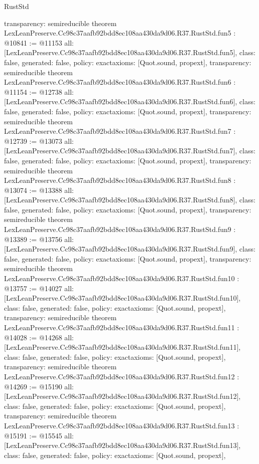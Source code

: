\begin{lexlean}{RustStd}
\begin{coremodule}
{  transparency: semireducible
}
theorem LexLeanPreserve.Cc98c37aafb92bdd8ec108aa430da9d06.R37.RustStd.fun5 : @10841 := @11153 {
  all: [LexLeanPreserve.Cc98c37aafb92bdd8ec108aa430da9d06.R37.RustStd.fun5],
  class: false,
  generated: false,
  policy: exact{axioms: [Quot.sound, propext]},
  transparency: semireducible
}
theorem LexLeanPreserve.Cc98c37aafb92bdd8ec108aa430da9d06.R37.RustStd.fun6 : @11154 := @12738 {
  all: [LexLeanPreserve.Cc98c37aafb92bdd8ec108aa430da9d06.R37.RustStd.fun6],
  class: false,
  generated: false,
  policy: exact{axioms: [Quot.sound, propext]},
  transparency: semireducible
}
theorem LexLeanPreserve.Cc98c37aafb92bdd8ec108aa430da9d06.R37.RustStd.fun7 : @12739 := @13073 {
  all: [LexLeanPreserve.Cc98c37aafb92bdd8ec108aa430da9d06.R37.RustStd.fun7],
  class: false,
  generated: false,
  policy: exact{axioms: [Quot.sound, propext]},
  transparency: semireducible
}
theorem LexLeanPreserve.Cc98c37aafb92bdd8ec108aa430da9d06.R37.RustStd.fun8 : @13074 := @13388 {
  all: [LexLeanPreserve.Cc98c37aafb92bdd8ec108aa430da9d06.R37.RustStd.fun8],
  class: false,
  generated: false,
  policy: exact{axioms: [Quot.sound, propext]},
  transparency: semireducible
}
theorem LexLeanPreserve.Cc98c37aafb92bdd8ec108aa430da9d06.R37.RustStd.fun9 : @13389 := @13756 {
  all: [LexLeanPreserve.Cc98c37aafb92bdd8ec108aa430da9d06.R37.RustStd.fun9],
  class: false,
  generated: false,
  policy: exact{axioms: [Quot.sound, propext]},
  transparency: semireducible
}
theorem LexLeanPreserve.Cc98c37aafb92bdd8ec108aa430da9d06.R37.RustStd.fun10 : @13757 := @14027 {
  all: [LexLeanPreserve.Cc98c37aafb92bdd8ec108aa430da9d06.R37.RustStd.fun10],
  class: false,
  generated: false,
  policy: exact{axioms: [Quot.sound, propext]},
  transparency: semireducible
}
theorem LexLeanPreserve.Cc98c37aafb92bdd8ec108aa430da9d06.R37.RustStd.fun11 : @14028 := @14268 {
  all: [LexLeanPreserve.Cc98c37aafb92bdd8ec108aa430da9d06.R37.RustStd.fun11],
  class: false,
  generated: false,
  policy: exact{axioms: [Quot.sound, propext]},
  transparency: semireducible
}
theorem LexLeanPreserve.Cc98c37aafb92bdd8ec108aa430da9d06.R37.RustStd.fun12 : @14269 := @15190 {
  all: [LexLeanPreserve.Cc98c37aafb92bdd8ec108aa430da9d06.R37.RustStd.fun12],
  class: false,
  generated: false,
  policy: exact{axioms: [Quot.sound, propext]},
  transparency: semireducible
}
theorem LexLeanPreserve.Cc98c37aafb92bdd8ec108aa430da9d06.R37.RustStd.fun13 : @15191 := @15545 {
  all: [LexLeanPreserve.Cc98c37aafb92bdd8ec108aa430da9d06.R37.RustStd.fun13],
  class: false,
  generated: false,
  policy: exact{axioms: [Quot.sound, propext]},
}
\end{coremodule}
\end{lexlean}
